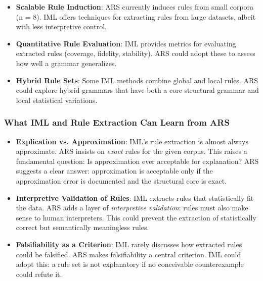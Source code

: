 \documentclass[12pt,a4paper]{article}
\begin{document}
\begin{itemize}
    \item \textbf{Scalable Rule Induction}: ARS currently induces rules from 
    small corpora (n = 8). IML offers techniques for extracting rules from 
    large datasets, albeit with less interpretive control.
    
    \item \textbf{Quantitative Rule Evaluation}: IML provides metrics for 
    evaluating extracted rules (coverage, fidelity, stability). ARS could 
    adopt these to assess how well a grammar generalizes.
    
    \item \textbf{Hybrid Rule Sets}: Some IML methods combine global and local 
    rules. ARS could explore hybrid grammars that have both a core structural 
    grammar and local statistical variations.
\end{itemize}

\subsubsection{What IML and Rule Extraction Can Learn from ARS}

\begin{itemize}
    \item \textbf{Explication vs. Approximation}: IML's rule extraction is 
    almost always approximate. ARS insists on \textit{exact} rules for the 
    given corpus. This raises a fundamental question: Is approximation ever 
    acceptable for explanation? ARS suggests a clear answer: approximation 
    is acceptable only if the approximation error is documented and the 
    structural core is exact.
    
    \item \textbf{Interpretive Validation of Rules}: IML extracts rules that 
    statistically fit the data. ARS adds a layer of \textit{interpretive 
    validation}: rules must also make sense to human interpreters. This could 
    prevent the extraction of statistically correct but semantically meaningless 
    rules.
    
    \item \textbf{Falsifiability as a Criterion}: IML rarely discusses how 
    extracted rules could be falsified. ARS makes falsifiability a central 
    criterion. IML could adopt this: a rule set is not explanatory if no 
    conceivable counterexample could refute it.
\end{itemize}
\end{document}
